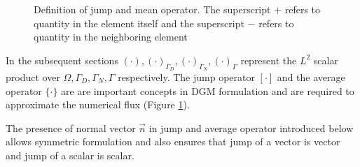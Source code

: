 \documentclass[graybox]{svmult}
\begin{document}
\begin{figure}
\centering
\sidecaption[t]
\caption{Definition of jump and mean operator. \newline The superscript $+$ refers to quantity in the element itself and the superscript $-$ refers to quantity in the neighboring element}
\label{fig:Self_neighbour}
\end{figure}

In the subsequent sections $\left( \cdot \right),\left( \cdot \right)_{\Gamma_D},\left( \cdot \right)_{\Gamma_N},\left( \cdot \right)_{\Gamma}$ represent the $L^2$ scalar product over $\Omega,\Gamma_D,\Gamma_N,\Gamma$ respectively. The jump operator $\left[ \cdot \right]$ and the average operator $\lbrace \cdot \rbrace$ are are important concepts in DGM formulation and are required to approximate the numerical flux (Figure \ref{fig:Self_neighbour}).

The presence of normal vector $\overrightarrow{n}$ in jump and average operator introduced below allows symmetric formulation and also ensures that jump of a vector is vector and jump of a scalar is scalar.
\end{document}
